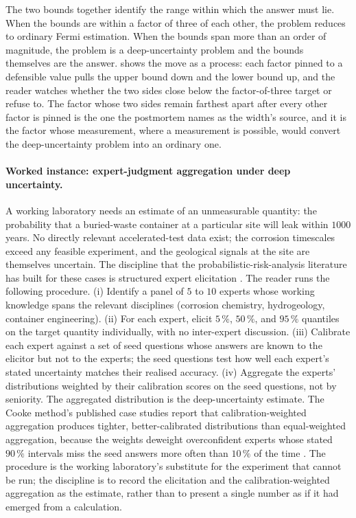 The two bounds together identify the range within which the answer
must lie. When the bounds are within a factor of three of each
other, the problem reduces to ordinary Fermi estimation. When the
bounds span more than an order of magnitude, the problem is a
deep-uncertainty problem and the bounds themselves are the answer.
 shows the move as a process:
each factor pinned to a defensible value pulls the upper bound down and
the lower bound up, and the reader watches whether the two sides close
below the factor-of-three target or refuse to. The factor whose two
sides remain farthest apart after every other factor is pinned is the
one the postmortem names as the width's source, and it is the factor
whose measurement, where a measurement is possible, would convert the
deep-uncertainty problem into an ordinary one.



\paragraph{Worked instance: expert-judgment aggregation under
deep uncertainty.}
A working laboratory needs an estimate of an unmeasurable quantity:
the probability that a buried-waste container at a particular site
will leak within $1000$ years. No directly relevant accelerated-test
data exist; the corrosion timescales exceed any feasible
experiment, and the geological signals at the site are themselves
uncertain. The discipline that the probabilistic-risk-analysis
literature has built for these cases is structured expert
elicitation \cite{ch09-paper:bedford-cooke-2001,
paper:ch09-cooke-expert-2008}. The reader runs the following
procedure. (i) Identify a panel of $5$ to $10$ experts whose
working knowledge spans the relevant disciplines (corrosion
chemistry, hydrogeology, container engineering). (ii) For each
expert, elicit $5\,\%$, $50\,\%$, and $95\,\%$ quantiles on the
target quantity individually, with no inter-expert discussion. (iii)
Calibrate each expert against a set of seed questions whose answers
are known to the elicitor but not to the experts; the seed
questions test how well each expert's stated uncertainty matches
their realised accuracy. (iv) Aggregate the experts' distributions
weighted by their calibration scores on the seed questions, not by
seniority. The aggregated distribution is the deep-uncertainty
estimate. The Cooke method's published case studies report that
calibration-weighted aggregation produces tighter, better-calibrated
distributions than equal-weighted aggregation, because the weights
deweight overconfident experts whose stated $90\,\%$ intervals
miss the seed answers more often than $10\,\%$ of the time
\cite{paper:ch09-cooke-expert-2008}. The procedure is the working
laboratory's substitute for the experiment that cannot be run;
the discipline is to record the elicitation and the
calibration-weighted aggregation as the estimate, rather than to
present a single number as if it had emerged from a calculation.

